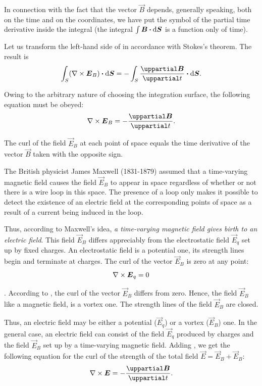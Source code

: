 \noindent
In connection with the fact that the vector $\vec{B}$ depends, generally speaking, both on the time and on the coordinates, we have put the symbol of the partial time derivative inside the integral (the integral $\int\boldsymbol{B}\boldsymbol{\cdot}\mathrm{d}\boldsymbol{S}$ is a function only of time).

Let us transform the left-hand side of  in accordance with Stokes's theorem.
The result is
\begin{equation*}
    \int_S (\curlop{\vec{E}_B}) \ccdot \derivec{S} = - \int_S \diffpartial{\vec{B}}{t} \ccdot \derivec{S}.
\end{equation*}

\noindent
Owing to the arbitrary nature of choosing the integration surface, the following equation must be obeyed:
\begin{equation}\label{eq:9_3}
    \curlop{\vec{E}_B} = - \diffpartial{\vec{B}}{t}.
\end{equation}

\noindent
The curl of the field $\vec{E}_B$ at each point of space equals the time derivative of the vector $\vec{B}$ taken with the opposite sign.

The British physicist James Maxwell (1831-1879) assumed that a time-varying magnetic field causes the field $\vec{E}_B$ to appear in space regardless of whether or not there is a wire loop in this space.
The presence of a loop only makes it possible to detect the existence of an electric field at the corresponding points of space as a result of a current being induced in the loop.

Thus, according to Maxwell's idea, \textit{a time-varying magnetic field gives birth to an electric field}.
This field $\vec{E}_B$ differs appreciably from the electrostatic field $\vec{E}_q$ set up by fixed charges.
An electrostatic field is a potential one, its strength lines begin and terminate at charges.
The curl of the vector $\vec{E}_B$ is zero at any point:
\begin{equation}\label{eq:9_4}
    \nabla\times\boldsymbol{E}_q = 0
\end{equation}

.
According to , the curl of the vector $\vec{E}_B$ differs from zero.
Hence, the field $\vec{E}_B$ like a magnetic field, is a vortex one.
The strength lines of the field $\vec{E}_B$ are closed.

Thus, an electric field may be either a potential ($\vec{E}_q$) or a vortex ($\vec{E}_B$) one.
In the general case, an electric field can consist of the field $\vec{E}_q$ produced by charges and the field $\vec{E}_B$ set up by a time-varying magnetic field.
Adding , we get the following equation for the curl of the strength of the total field $\vec{E}=\vec{E}_B+\vec{E}_B$:
\begin{equation}\label{eq:9_5}
    \curlop{\vec{E}} = - \diffpartial{\vec{B}}{t}.
\end{equation}

